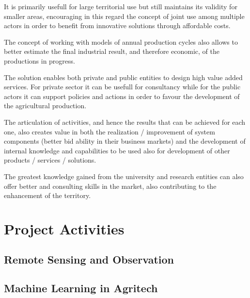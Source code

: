 \documentclass[conference]{IEEEtran}
\begin{document}
It is primarily usefull for large territorial use but still maintains its validity for smaller areas, encouraging in this regard the concept of joint use among multiple actors in order to benefit from innovative solutions through affordable costs.


The concept of working with models of annual production cycles also allows to better estimate the final industrial result, and therefore economic, of the productions in progress.


The solution enables both private and public entities to design high value added services. For private sector it can be usefull for consultancy while for the public actors it can support policies and actions in order to favour the development of the agricultural production.


The articulation of activities, and hence the results that can be achieved for each one, also creates value in both the realization / improvement of system components (better bid ability in their business markets) and the development of internal knowledge and capabilities to be used also for development of other products / services / solutions.


The greatest knowledge gained from the university and research entities can also offer better and consulting skills in the market, also contributing to the enhancement of the territory.

\lipsum[2-3]

\section{Project Activities} 

\subsection{Remote Sensing and Observation}

\lipsum[2-10] %

\subsection{Machine Learning in Agritech}
\end{document}
